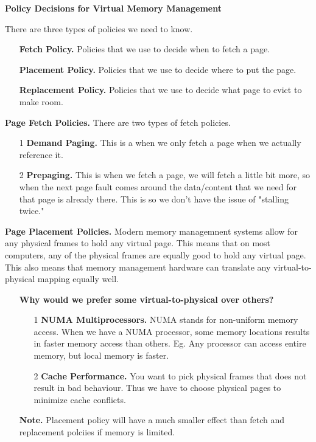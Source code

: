 \documentclass[12pt]{article}
\begin{document}
{\bf Policy Decisions for Virtual Memory Management} \vspace{-0.5em} \par {There are three types of policies we need to know.}
    \begin{enumerate}
        \item[]{\bf Fetch Policy.} {Policies that we use to decide when to fetch a page.}
        \item[]{\bf Placement Policy.} {Policies that we use to decide where to put the page.}
        \item[]{\bf Replacement Policy.} {Policies that we use to decide what page to evict to make room.} 
    \end{enumerate}

\vspace{1em}

{\bf Page Fetch Policies.} {There are two types of fetch policies.}
    \begin{enumerate}
        \item[1]{\bf Demand Paging.} {This is a when we only fetch a page when we actually reference it. }
        \item[2]{\bf Prepaging.} {This is when we fetch a page, we will fetch a little bit more, so when the next page fault comes around the data/content that we need for that page is already there. This is so we don't have the issue of "stalling twice."} 
    \end{enumerate}

\vspace{1em}

{\bf Page Placement Policies.} {Modern memory managemnent systems allow for any physical frames to hold any virtual page. This means that on most computers, any of the physical frames are equally good to hold any virtual page. This also means that memory management hardware can translate any virtual-to-physical mapping equally well. } 
    \begin{enumerate}
        \item[]{\bf Why would we prefer some virtual-to-physical over others?}
        \vspace{-0.5em}
        \begin{enumerate}
            \item [1]{\bf NUMA Multiprocessors.} {NUMA stands for non-uniform memory access. When we have a NUMA processor, some memory locations results in faster memory access than others. Eg. Any processor can access entire memory, but local memory is faster. }
            \item [2]{\bf Cache Performance.} {You want to pick physical frames that does not result in bad behaviour. Thus we have to choose physical pages to minimize cache conflicts.}
        \end{enumerate}
        \item[]{\bf Note.} {Placement policy will have a much smaller effect than fetch and replacement polciies if memory is limited.} 
    \end{enumerate}
\end{document}
